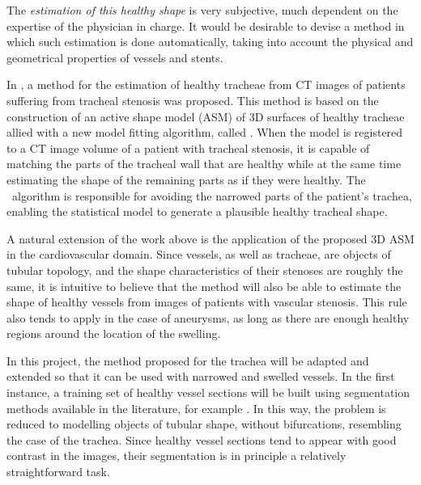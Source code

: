 The {\em estimation of this healthy shape} is very subjective, much dependent on the expertise of the physician in charge. It would be desirable to devise a method in which such estimation is done automatically, taking into account the physical and geometrical properties of vessels and stents.

\approach
In \citep{Pinho:Trachea4}, a method for the estimation of healthy tracheae from CT images of patients suffering from tracheal stenosis was proposed. This method is based on the construction of an active shape model (ASM) \citep{Cootes} of 3D surfaces of healthy tracheae allied with a new model fitting algorithm, called \fixedland. When the model is registered to a CT image volume of a patient with tracheal stenosis, it is capable of matching the parts of the tracheal wall that are healthy while at the same time estimating the shape of the remaining parts as if they were healthy. The \fixedland\ algorithm is responsible for avoiding the narrowed parts of the patient's trachea, enabling the statistical model to generate a plausible healthy tracheal shape.

A natural extension of the work above is the application of the proposed 3D ASM in the cardiovascular domain. Since vessels, as well as tracheae, are objects of tubular topology, and the shape characteristics of their stenoses are roughly the same, it is intuitive to believe that the method will also be able to estimate the shape of healthy vessels from images of patients with vascular stenosis. This rule also tends to apply in the case of aneurysms, as long as there are enough healthy regions around the location of the swelling.

In this project, the method proposed for the trachea will be adapted and extended so that it can be used with narrowed and swelled vessels. In the first instance, a training set of healthy vessel sections will be built using segmentation methods available in the literature, for example \citep{Florez2}. In this way, the problem is reduced to modelling objects of tubular shape, without bifurcations, resembling the case of the trachea. Since healthy vessel sections tend to appear with good contrast in the images, their segmentation is in principle a relatively straightforward task. 

